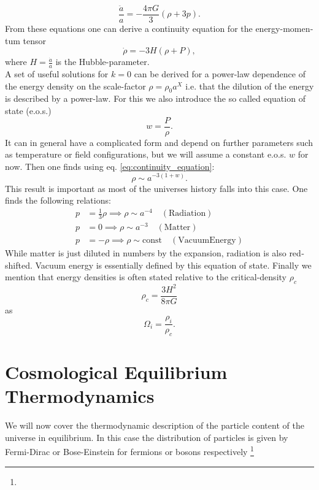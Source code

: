 \documentclass[master,       %
               twoside,        %
               BCOR10mm,       %
               english,ngerman, %
               ]{GAUBM}
\begin{document}
\begin{otherlanguage}{english}
{}
\begin{equation}
	\frac{\ddot{a}}{a} = - \frac{4 \pi G}{3} ( \rho + 3 p ).
\end{equation}
From these equations one can derive a continuity equation for the energy-momentum tensor
\begin{equation}
	\label{eq:continuity_equation}
	\dot{\rho} = - 3 H (\rho + P),
\end{equation}
where $H = \frac{\dot{a}}{a}$ is the Hubble-parameter. \\
\noindent A set of useful solutions for $k = 0$ can be derived for a power-law dependence of the energy density on the scale-factor $\rho = \rho_0 a^X$ i.e. that the dilution of the energy is described by a power-law. For this we also introduce the so called equation of state (e.o.s.)
\begin{equation}
	w = \frac{P}{\rho}.
\end{equation}
It can in general have a complicated form and depend on further parameters such as temperature or field configurations, but we will assume a constant e.o.s. $w$ for now.
Then one finds using eq. \eqref{eq:continuity_equation}:
\begin{equation}
	\rho \sim a^{-3(1 + w)}.
\end{equation}
This result is important as most of the universes history falls into this case.
One finds the following relations:
\begin{align}
	p &= \frac{1}{3} \rho \implies \rho \sim a^{-4} \quad \mathrm{(Radiation)} \nonumber \\
	p &= 0 \implies \rho \sim a^{-3} \quad \mathrm{(Matter)} \nonumber \\
	p &= - \rho \implies \rho \sim \mathrm{const} \quad \mathrm{(Vacuum Energy)}
\end{align}
While matter is just diluted in numbers by the expansion, radiation is also redshifted.
Vacuum energy is essentially defined by this equation of state.
Finally we mention that energy densities is often stated relative to the critical-density $\rho_c$
\begin{equation}
	\label{eq:critical_density}
	\rho_c = \frac{3 H^2}{8 \pi G}
\end{equation}
as
\begin{equation}
	\Omega_i = \frac{\rho_i}{\rho_c}.
\end{equation}

\section{Cosmological Equilibrium Thermodynamics}
We will now cover the thermodynamic description of the particle content of the universe
in equilibrium.
In this case the distribution of particles is given by Fermi-Dirac or Bose-Einstein for fermions or bosons respectively \footnote{

}
\end{otherlanguage}
\end{document}
